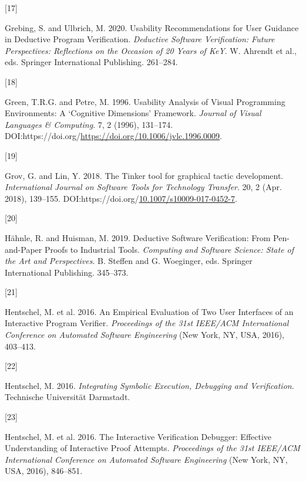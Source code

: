 \documentclass[
]{article}
\newlength{\cslhangindent}
\newlength{\csllabelwidth}
\newlength{\cslentryspacingunit} %
\newenvironment{CSLReferences}[2] %
 {%
  \setlength{\parindent}{0pt}
  \ifodd #1
  \let\oldpar\par
  \def\par{\hangindent=\cslhangindent\oldpar}
  \fi
  \setlength{\parskip}{#2\cslentryspacingunit}
 }%
 {}
\newcommand{\CSLLeftMargin}[1]{\parbox[t]{\csllabelwidth}{#1}}
\newcommand{\CSLRightInline}[1]{\parbox[t]{\linewidth - \csllabelwidth}{#1}\break}
\begin{document}
\begin{CSLReferences}{0}{0}
\leavevmode{}%
\CSLLeftMargin{{[}17{]} }
\CSLRightInline{Grebing, S. and Ulbrich, M. 2020. Usability
{Recommendations} for {User} {Guidance} in {Deductive} {Program}
{Verification}. \emph{Deductive {Software} {Verification}: {Future}
{Perspectives}: {Reflections} on the {Occasion} of 20 {Years} of {KeY}}.
W. Ahrendt et al., eds. Springer International Publishing. 261--284.}

\leavevmode{}%
\CSLLeftMargin{{[}18{]} }
\CSLRightInline{Green, T.R.G. and Petre, M. 1996. Usability {Analysis}
of {Visual} {Programming} {Environments}: {A} {`{Cognitive}
{Dimensions}'} {Framework}. \emph{Journal of Visual Languages \&
Computing}. 7, 2 (1996), 131--174.
DOI:https://doi.org/\url{https://doi.org/10.1006/jvlc.1996.0009}.}

\leavevmode{}%
\CSLLeftMargin{{[}19{]} }
\CSLRightInline{Grov, G. and Lin, Y. 2018. The {Tinker} tool for
graphical tactic development. \emph{International Journal on Software
Tools for Technology Transfer}. 20, 2 (Apr. 2018), 139--155.
DOI:https://doi.org/\href{https://doi.org/10.1007/s10009-017-0452-7}{10.1007/s10009-017-0452-7}.}

\leavevmode{}%
\CSLLeftMargin{{[}20{]} }
\CSLRightInline{Hähnle, R. and Huisman, M. 2019. Deductive {Software}
{Verification}: {From} {Pen}-and-{Paper} {Proofs} to {Industrial}
{Tools}. \emph{Computing and {Software} {Science}: {State} of the {Art}
and {Perspectives}}. B. Steffen and G. Woeginger, eds. Springer
International Publishing. 345--373.}

\leavevmode{}%
\CSLLeftMargin{{[}21{]} }
\CSLRightInline{Hentschel, M. et al. 2016. An {Empirical} {Evaluation}
of {Two} {User} {Interfaces} of an {Interactive} {Program} {Verifier}.
\emph{Proceedings of the 31st {IEEE}/{ACM} {International} {Conference}
on {Automated} {Software} {Engineering}} (New York, NY, USA, 2016),
403--413.}

\leavevmode{}%
\CSLLeftMargin{{[}22{]} }
\CSLRightInline{Hentschel, M. 2016. \emph{Integrating {Symbolic}
{Execution}, {Debugging} and {Verification}}. Technische Universität
Darmstadt.}

\leavevmode{}%
\CSLLeftMargin{{[}23{]} }
\CSLRightInline{Hentschel, M. et al. 2016. The {Interactive}
{Verification} {Debugger}: {Effective} {Understanding} of {Interactive}
{Proof} {Attempts}. \emph{Proceedings of the 31st {IEEE}/{ACM}
{International} {Conference} on {Automated} {Software} {Engineering}}
(New York, NY, USA, 2016), 846--851.}


\end{CSLReferences}
\end{document}
